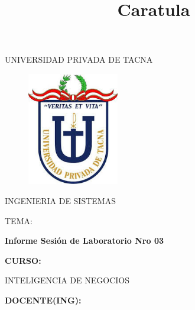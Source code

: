 \documentclass[12pt,letterpaper]{article}
\begin{document}
%


\title{Caratula}

\begin{titlepage}
\begin{center}
\large{UNIVERSIDAD PRIVADA DE TACNA}\\
\vspace*{-0.025in}
\begin{figure}[htb]
\begin{center}
\includegraphics[width=4cm]{./Imagenes/logo}
\end{center}
\end{figure}
\vspace*{0.15in}
INGENIERIA DE SISTEMAS  \\

\vspace*{0.5in}
\begin{large}
TEMA:\\
\end{large}

\vspace*{0.1in}
\begin{Large}
\textbf{Informe Sesión de Laboratorio Nro 03} \\
\end{Large}

\vspace*{0.3in}
\begin{Large}
\textbf{CURSO:} \\
\end{Large}

\vspace*{0.1in}
\begin{large}
INTELIGENCIA DE NEGOCIOS\\
\end{large}

\vspace*{0.3in}
\begin{Large}
\textbf{DOCENTE(ING):} \\
\end{Large}


\end{center}
\end{titlepage}
\end{document}
